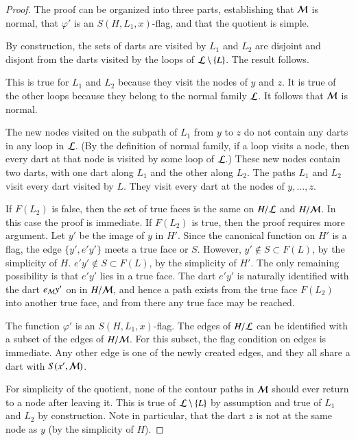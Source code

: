 \begin{proof} The proof can be organized into three parts,
establishing that ${\cal M}$ is normal, that $\varphi'$ is an $S(H,L_1,x)$-flag,
and that the quotient is simple.  %

 
By construction, the sets of darts are visited by $L_1$ and $L_2$
are disjoint and disjont from the darts visited by the loops of
${\cal L}\setminus \{L\}$.  The result follows.

   This
is true for $L_1$ and $L_2$ because they visit the nodes of $y$ and
$z$.  It is true of the other loops because they belong to the
normal family ${\cal L}$. It follows that ${\cal M}$ is normal.

   The new nodes visited on the
subpath of $L_1$ from $y$ to $z$ do not contain any darts in any
loop in ${\cal L}$.  (By the definition of normal family, if a loop
visits a node, then every dart at that node is visited by some loop
of ${\cal L}$.)  These new nodes contain two darts, with one dart
along $L_1$ and the other along $L_2$.  The paths $L_1$ and $L_2$
visit every dart visited by $L$.  They visit every dart at the nodes
of $y,\ldots,z$.

   If $F(L_2)$ is
false, then the set of true faces is the same on $H/{\cal L}$ and
$H/{\cal M}$.  In this case the proof is immediate.  If $F(L_2)$ is
true, then the proof requires more argument.  Let $y'$ be the image
of $y$ in $H'$.  Since the canonical function on $H'$ is a flag, the
edge $\{y',e'y'\}$ meets a true face or $S$.  However, $y'\not\in
S\subset F(L)$, by the simplicity of $H$.  $e'y'\not\in S \subset
F(L)$, by the simplicity of $H'$.  The only remaining possibility is
that $e'y'$ lies in a true face.  The dart $e'y'$ is naturally
identified with the dart $e_{\cal M} y'$ on in $H/{\cal M}$, and
hence a path exists from the true face $F(L_2)$ into another true
face, and from there any true face may be reached.

   The
function $\varphi'$ is an $S(H,L_1,x)$-flag.  The edges of $H/{\cal
L}$ can be identified with a subset of the edges of $H/{\cal M}$.
For this subset, the flag condition on edges is immediate.  Any
other edge is one of the newly created edges, and they all share a
dart with $S(x',{\cal M})$.


 For simplicity of the quotient, none of the contour
paths in ${\cal M}$ should ever return to a node after leaving it.
This is true of ${\cal L}\setminus\{L\}$ by assumption and true of
$L_1$ and $L_2$ by construction.  Note in particular, that the dart
$z$ is not at the same node as $y$ (by the simplicity of $H$).
\end{proof}


